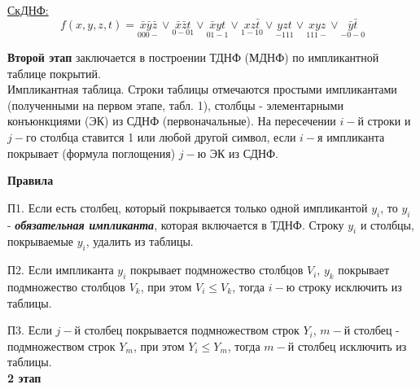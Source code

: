 \documentclass{article}
\begin{document}
	\underline{СкДНФ:}
	$$f(x, y, z, t) = \underset{000-}{\bar{x} \bar{y} \bar{z}} \vee
	\underset{0-01}{\bar{x} \bar{z} t} \vee \underset{01-1}{\bar{x} yt} \vee
	\underset{1-10}{xz \bar{t}} \vee \underset{-111}{yzt} \vee
	\underset{111-}{xyz} \vee \underset{-0-0}{\bar{y} \bar{t}}$$
	
	\textbf{Второй этап} заключается в построении ТДНФ (МДНФ) по импликантной
	таблице покрытий.\\
	Импликантная таблица. Строки таблицы отмечаются простыми импликантами
	(полученными на первом этапе, табл. 1), столбцы - элементарными конъюнкциями
	(ЭК) из СДНФ (первоначальные). На пересечении $i - й$ строки и $j - го$
	столбца ставится 1 или любой другой символ, если $i - я$ импликанта
	покрывает (формула поглощения) $j - ю$ ЭК из СДНФ.
	\newpage
	
	\begin{center}
		\textbf{Правила}
	\end{center}
	
	\quad П1. Если есть столбец, который покрывается только одной импликантой $y_i$,
	то $y_i$ - \textbf{\textit{обязательная импликанта}}, которая включается в
	ТДНФ. Строку $y_i$ и столбцы, покрываемые $y_i$, удалить из таблицы.\par
	\quad П2. Если импликанта $y_i$ покрывает подмножество столбцов $V_i$,
	$y_k$ покрывает подмножество столбцов $V_k$, при этом $V_i \leqslant V_k$,
	тогда $i-ю$ строку исключить из таблицы.\par
	\quad П3. Если $j-й$ столбец покрывается подмножеством строк $Y_i$, $m-й$
	столбец - подмножеством строк $Y_m$, при этом $Y_i \leqslant Y_m$, тогда
	$m-й$ столбец исключить из таблицы.\\
	
	\textbf{2 этап}
	
\end{document}
